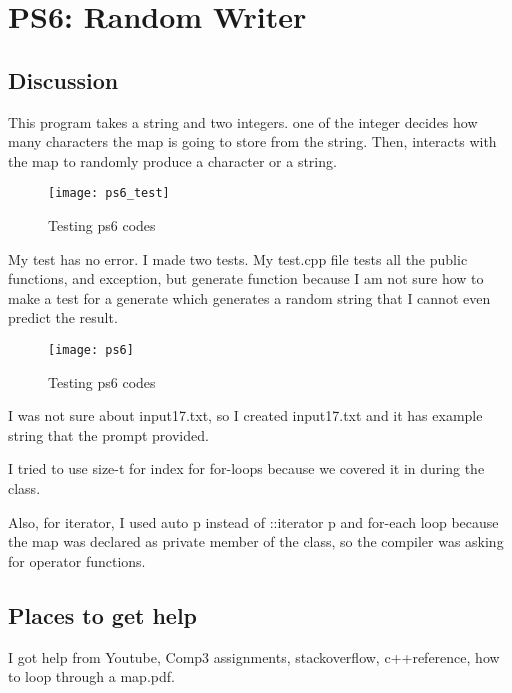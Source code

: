 \section{PS6: Random Writer}\label{sec:ps6}

\subsection{Discussion}\label{sec:ps6:disc}

This program takes a string and two integers. one of the integer decides how many characters the map is going to store from the string. Then, interacts with the map to randomly produce a character or a string.

\begin{figure}[tbh]
	\centering
	\texttt{[image: ps6\_test]}
	\caption{Testing ps6 codes}
	\label{fig:ps6_test}
\end{figure}

My test has no error.
I made two tests. My test.cpp file tests all the public functions, and exception, but generate function because I am not sure how to make a test for a generate which generates a random string that I cannot even predict the result.

\begin{figure}[tbh]
	\centering
	\texttt{[image: ps6]}
	\caption{Testing ps6 codes}
	\label{fig:ps6}
\end{figure}

I was not sure about input17.txt, so I created input17.txt and it has example string that the prompt provided.

I tried to use size-t for index for for-loops because we covered it in during the class.

Also, for iterator, I used auto p instead of ::iterator p and for-each loop because the map was declared as private member of the class, so the compiler was asking for operator functions.

\subsection{Places to get help}
I got help from Youtube, Comp3 assignments, stackoverflow, c++reference, how to loop through a map.pdf.


